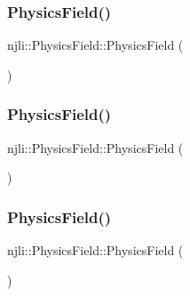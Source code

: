 \subsubsection{\texorpdfstring{Physics\+Field()}{PhysicsField()}\hspace{0.1cm}{\footnotesize\ttfamily [1/3]}}
{\footnotesize\ttfamily njli\+::\+Physics\+Field\+::\+Physics\+Field (\begin{DoxyParamCaption}{ }\end{DoxyParamCaption})\hspace{0.3cm}{\ttfamily [protected]}}

\mbox{\label{classnjli_1_1_physics_field_a44e9f7757b2ebcda987938a0abea31b3}} 
\subsubsection{\texorpdfstring{Physics\+Field()}{PhysicsField()}\hspace{0.1cm}{\footnotesize\ttfamily [2/3]}}
{\footnotesize\ttfamily njli\+::\+Physics\+Field\+::\+Physics\+Field (\begin{DoxyParamCaption}\item[{const \mbox{\hyperlink{classnjli_1_1_abstract_builder}{Abstract\+Builder}} \&}]{ }\end{DoxyParamCaption})\hspace{0.3cm}{\ttfamily [protected]}}

\mbox{\label{classnjli_1_1_physics_field_a927f25e2cfa6e4dded2c44b4b15600a0}} 
\subsubsection{\texorpdfstring{Physics\+Field()}{PhysicsField()}\hspace{0.1cm}{\footnotesize\ttfamily [3/3]}}
{\footnotesize\ttfamily njli\+::\+Physics\+Field\+::\+Physics\+Field (\begin{DoxyParamCaption}\item[{const \mbox{\hyperlink{classnjli_1_1_physics_field}{Physics\+Field}} \&}]{ }\end{DoxyParamCaption})\hspace{0.3cm}{\ttfamily [protected]}}

